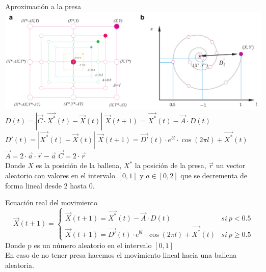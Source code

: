 \documentclass[10pt]{beamer}
\begin{document}
	\begin{frame}[fragile]{Aproximación a la presa}
		\includegraphics[scale=0.23]{./Imagenes/imagen3.png}
		\pause
		\vspace{5px}
		$D(t) = |\vec{C}\cdot \vec{X^*}(t)-\vec{X}(t)|$ \hspace{20px} $\vec{X}(t+1) = \vec{X^*}(t)-\vec{A}\cdot D(t)$ \\
		\pause
		$D'(t) = |\vec{X^*}(t)-\vec{X}(t)|$ \hspace{20px} $\vec{X}(t+1) = \vec{D'}(t)\cdot e^{bl}\cdot \cos (2\pi l)+\vec{X^*}(t)$ \\
		\vspace{10px}
		$\vec{A} = 2\cdot \vec{a}\cdot \vec{r}-\vec{a}$ \hspace{20px} $\vec{C}=2\cdot \vec{r}$ \\
		\pause
		Donde $X$ es la posición de la ballena, $X^*$ la posición de la presa, $\vec{r}$ un vector aleatorio con valores en el intervalo $[0,1]$ y $a\in [0,2]$ que se decrementa de forma lineal desde 2 hasta 0.
	\end{frame}
	
	\begin{frame}[fragile]{Ecuación real del movimiento}
		\pause
		$$
		\vec{X}(t+1)=
		\begin{cases}
		\vec{X}(t+1) = \vec{X^*}(t)-\vec{A}\cdot D(t) & si \ p<0.5\\
		\vec{X}(t+1) = \vec{D'}(t)\cdot e^{bl}\cdot \cos (2\pi l)+\vec{X^*}(t) & si \ p \geq 0.5
		\end{cases}
		$$
		\pause
		Donde p es un número aleatorio en el intervalo $[0,1]$ \\
		\pause
		En caso de no tener presa hacemos el movimiento lineal hacia una ballena aleatoria.
	\end{frame}
	
\end{document}

